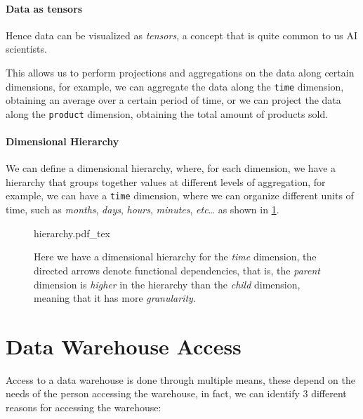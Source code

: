 \documentclass[openright, twoside, twocolumn, a4paper, 10pt]{report}
\newcommand{\incsvg}[2]{%
	\def\svgwidth{\columnwidth}
	{#2.pdf_tex}%
}
\begin{document}
\paragraph{Data as tensors}

Hence data can be visualized as \emph{tensors}, a concept that is
quite common to us AI scientists.

This allows us to perform projections and aggregations on the data
along certain dimensions, for example, we can aggregate
the data along the \texttt{time} dimension, obtaining
an average over a certain period of time, or we can
project the data along the \texttt{product} dimension, obtaining
the total amount of products sold.

\paragraph{Dimensional Hierarchy}

We can define a dimensional hierarchy, where, for each dimension, we
have a hierarchy that groups together values at different
levels of aggregation, for example, we can have a \texttt{time}
dimension, where we can organize different units of time, such as
\emph{months}, \emph{days}, \emph{hours}, \emph{minutes}, \emph{etc}\dots\@
as shown in \cref{fig:hierarchy}.


\begin{figure}[h!]
	\centering
	\incsvg{fig}{hierarchy}\\
	\caption{Here we have a dimensional hierarchy for the
		\emph{time} dimension, the directed arrows denote functional
		dependencies, that is, the \emph{parent} dimension is
		\emph{higher} in the hierarchy than the \emph{child} dimension, meaning
		that it has more \emph{granularity}.}\label{fig:hierarchy}%
\end{figure}

\section{Data Warehouse Access}

Access to a data warehouse is done through multiple means, these depend on the
needs of the person accessing the warehouse, in fact, we can identify 3 different
reasons for accessing the warehouse:
\end{document}
